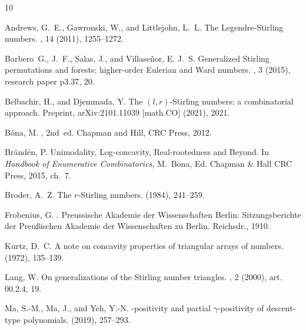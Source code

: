 \documentclass{article}
\theoremstyle{definition}
\numberwithin{equation}{section}
\begin{document}
\begin{thebibliography}{10}

{\sc Andrews, G.~E., Gawronski, W., and Littlejohn, L.~L.}
\newblock The {Legendre}-{Stirling} numbers.
, 14 (2011), 1255--1272.

{\sc Barbero~G., J.~F., Salas, J., and Villase{\~n}or, E. J.~S.}
\newblock Generalized {Stirling} permutations and forests: higher-order {Eulerian} and {Ward} numbers.
, 3 (2015), research paper p3.37, 20.

{\sc Belbachir, H., and Djemmada, Y.}
\newblock The $(l,r)$-{Stirling} numbers: a combinatorial approach.
\newblock Preprint, {arXiv}:2101.11039 [math.{CO}] (2021), 2021.

{\sc B{\'o}na, M.}
, 2nd~ed.
\newblock Chapman and Hill, CRC Press, 2012.

{\sc Br{\"a}nd{\'e}n, P.}
\newblock Unimodality, {L}og-concavity, {R}eal-rootedness and {B}eyond.
\newblock In {\em Handbook of Enumerative Combinatorics}, M.~Bona, Ed. Chapman \& Hall \/ CRC Press, 2015, ch.~7.

{\sc Broder, A.~Z.}
\newblock The {{\(r\)}}-{Stirling} numbers.
 (1984), 241--259.

{\sc Frobenius, G.}
.
\newblock Preussische Akademie der Wissenschaften Berlin: Sitzungsberichte der Preu{\ss}ischen Akademie der Wissenschaften zu Berlin. Reichsdr., 1910.

{\sc Kurtz, D.~C.}
\newblock A note on concavity properties of triangular arrays of numbers.
 (1972), 135--139.

{\sc Lang, W.}
\newblock On generalizations of the {Stirling} number triangles.
, 2 (2000), art. 00.2.4, 19.

{\sc Ma, S.-M., Ma, J., and Yeh, Y.-N.}
\newblock {{\(\gamma\)}}-positivity and partial {{\(\gamma\)}}-positivity of descent-type polynomials.
 (2019), 257--293.


\end{thebibliography}
\end{document}

